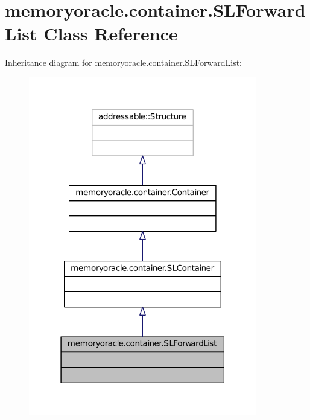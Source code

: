 \hypertarget{classmemoryoracle_1_1container_1_1SLForwardList}{}\section{memoryoracle.\+container.\+S\+L\+Forward\+List Class Reference}
\label{classmemoryoracle_1_1container_1_1SLForwardList}


Inheritance diagram for memoryoracle.\+container.\+S\+L\+Forward\+List\+:\nopagebreak
\begin{figure}[H]
\begin{center}
\leavevmode
\includegraphics[width=283pt]{classmemoryoracle_1_1container_1_1SLForwardList__inherit__graph}
\end{center}
\end{figure}


